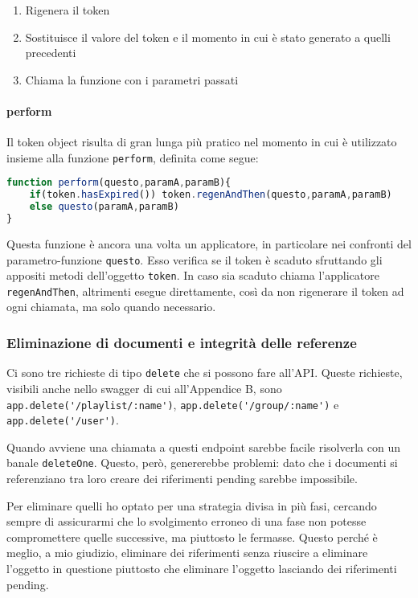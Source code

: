 \begin{enumerate}
    \item Rigenera il token
    \item Sostituisce il valore del token e il momento in cui è stato generato a quelli precedenti
    \item Chiama la funzione con i parametri passati
\end{enumerate}
\paragraph{perform} Il token object risulta di gran lunga più pratico nel momento in cui è utilizzato insieme alla funzione \verb|perform|, definita come segue:
\begin{lstlisting}[language=JavaScript]
function perform(questo,paramA,paramB){
    if(token.hasExpired()) token.regenAndThen(questo,paramA,paramB)
    else questo(paramA,paramB)
}
\end{lstlisting}
Questa funzione è ancora una volta un applicatore, in particolare nei confronti del parametro-funzione \verb|questo|. Esso verifica se il token è scaduto sfruttando gli appositi metodi dell'oggetto \verb|token|. In caso sia scaduto chiama l'applicatore \verb|regenAndThen|, altrimenti esegue direttamente, così da non rigenerare il token ad ogni chiamata, ma solo quando necessario.
\subsubsection{Eliminazione di documenti e integrità delle referenze}
Ci sono tre richieste di tipo \verb|delete| che si possono fare all'API. Queste richieste, visibili anche nello swagger di cui all'Appendice B, sono \verb|app.delete('/playlist/:name')|, \verb|app.delete('/group/:name')| e \verb|app.delete('/user')|.

Quando avviene una chiamata a questi endpoint sarebbe facile risolverla con un banale \verb|deleteOne|. Questo, però, genererebbe problemi: dato che i documenti si referenziano tra loro creare dei riferimenti pending sarebbe impossibile.

Per eliminare quelli ho optato per una strategia divisa in più fasi, cercando sempre di assicurarmi che lo svolgimento erroneo di una fase non potesse compromettere quelle successive, ma piuttosto le fermasse. Questo perché è meglio, a mio giudizio, eliminare dei riferimenti senza riuscire a eliminare l'oggetto in questione piuttosto che eliminare l'oggetto lasciando dei riferimenti pending.

